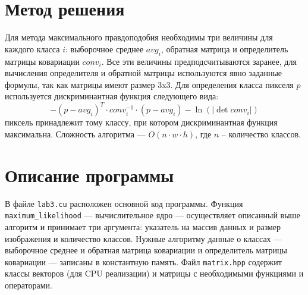 \section{Метод решения}
Для метода максимального правдоподобия необходимы три величины для каждого класса $i$: выборочное среднее $avg_i$, обратная матрица и определитель матрицы ковариации $conv_i$. Все эти величины предподсчитываются заранее, для вычисления определителя и обратной матрицы используются явно заданные формулы, так как матрицы имеют размер 3x3. Для определения класса пикселя $p$ используется дискриминантная функция следующего вида:
$$-(p - avg_i)^{T} \cdot conv_i^{-1} \cdot (p - avg_i) - \ln(|\det conv_i|)$$
пиксель принадлежит тому классу, при котором дискриминантная функция максимальна. Сложность алгоритма --- $O(n \cdot w \cdot h)$, где $n$ -- количество классов.

\section{Описание программы}
В файле \texttt{lab3.cu} расположен основной код программы. Функция \texttt{maximum\_likelihood} --- вычислительное ядро --- осуществляет описанный выше алгоритм и принимает три аргумента: указатель на массив данных и размер изображения и количество классов. Нужные алгоритму данные о классах --- выборочное среднее и обратная матрица ковариации и определитель матрицы ковариации --- записаны в константную память. Файл \texttt{matrix.hpp} содержит классы векторов (для CPU реализации) и матрицы с необходимыми функциями и операторами.
